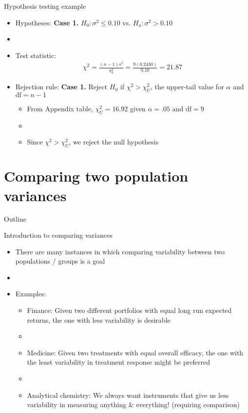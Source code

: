\documentclass[xcolor=dvipsnames]{beamer}
\begin{document}
\begin{frame}{Hypothesis testing example}
	\begin{itemize}
		\item Hypotheses: \textbf{Case 1.} $H_0: \sigma^2 \leq 0.10$ vs. $H_a: \sigma^2 > 0.10$
		\item[]
		\item Test statistic:
		\begin{gather*}
		\chi^2 = \frac{(n-1)s^2}{\sigma_0^2} = \frac{9 (0.2430)}{0.10} =  21.87
		\end{gather*}
		\item Rejection rule: \textbf{Case 1.} Reject $H_0$ if $\chi^2 > \chi_U^2$, the upper-tail value for $\alpha$ and $\text{df} = n-1$
		\begin{itemize}
			\item From Appendix table, $\chi^2_U = 16.92$ given $\alpha = .05$ and $\text{df} = 9$
			\item[]
			\item Since $\chi^2 > \chi^2_U$, we reject the null hypothesis
		\end{itemize}
	\end{itemize}
\end{frame}

\section{Comparing two population variances}
\begin{frame}{Outline}
	\tableofcontents[currentsection,subsectionstyle=show/shaded/hide]
\end{frame}

\begin{frame}{Introduction to comparing variances}
	\begin{itemize}
		\item There are many instances in which comparing variability between two populations / groups is a goal
	\item[]
	\item Examples:
	\begin{itemize}
		\item Finance: Given two different portfolios with equal long run expected returns, the one with less variability is desirable
		\item[]
		\item Medicine: Given two treatments with equal overall efficacy, the one with the least variability in treatment response might be preferred
		\item[]
		\item Analytical chemistry: We always want instruments that give us less variability in measuring anything \& everything! (requiring comparison)
	\end{itemize}
	\end{itemize}
\end{frame}
\end{document}
